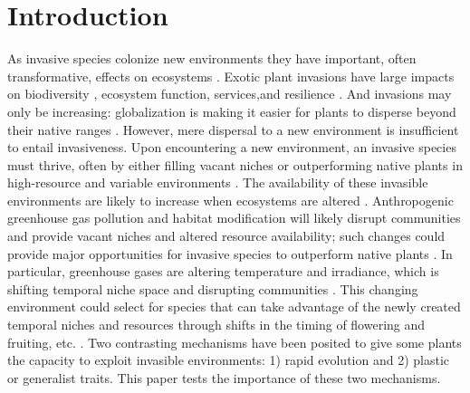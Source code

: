 \documentclass[12pt]{article}\usepackage[]{graphicx}\usepackage[]{color}
\begin{document}
	\section{Introduction}
	As invasive species colonize new environments they have important, often transformative, effects on ecosystems \parencite{Mack2000,Levine2003}.  Exotic plant invasions have large impacts on biodiversity \parencite{Bellard2016,Clavero2005,Walker1997}, ecosystem function, services,and resilience \parencite{Daehler1999,Daehler1994,Ehrenfeld2003,Wilcove1998,Pejchar2009,Pimentel2005,Pysek2010,OTA1993}.  And invasions may only be increasing: globalization is making it easier for plants to disperse beyond their native ranges \parencite{Helmus2014,McKinney1999,Pysek2002,Vitousek1996,Wittenberg2001}. However, mere dispersal to a new environment is insufficient to entail invasiveness. Upon encountering a new environment, an invasive species must thrive, often by either filling vacant niches \parencite{Elton1958} or outperforming native plants in high-resource and variable environments \parencite{Davis2001,Daehler2003}. The availability of these invasible environments are likely to increase when ecosystems are altered \parencite{Tilman2001}. Anthropogenic greenhouse gas pollution and  habitat modification will likely disrupt communities and provide vacant niches and altered resource availability; such changes could provide major opportunities for invasive species to outperform native plants \parencite{Blois2013}. In particular, greenhouse gases are altering temperature and irradiance, which is shifting temporal niche space and disrupting communities \parencite{Inouye2008,Harte2015}. This changing environment could select for species that can take advantage of the newly created temporal niches and resources through shifts in the timing of flowering and fruiting, etc. \parencite{Franks2007}. Two contrasting mechanisms have been posited to give some plants the capacity to exploit invasible environments: 1) rapid evolution and 2) plastic or generalist traits.  This paper tests the importance of these two mechanisms. 
\end{document}
